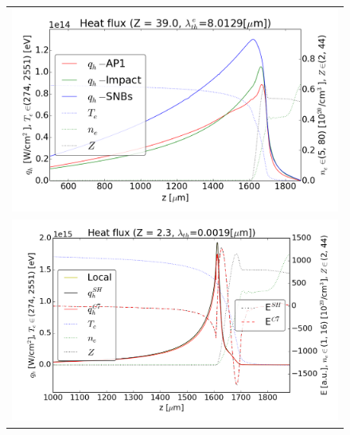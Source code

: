 \begin{figure}[tbh]
  \begin{center}
    \begin{tabular}{c}
      \includegraphics[width=1.0\textwidth]{../VFPdata/GD_Hohlraum/fluxes_10ps.png} \\
      \includegraphics[width=1.0\textwidth]{../VFPdata/GD_Hohlraum/diffusion_fluxes_Efield_10ps.png} 
    \end{tabular}
  \caption{
  }
  \end{center}
  \label{fig:Gd_VFP_10ps_heatflux}
\end{figure}

